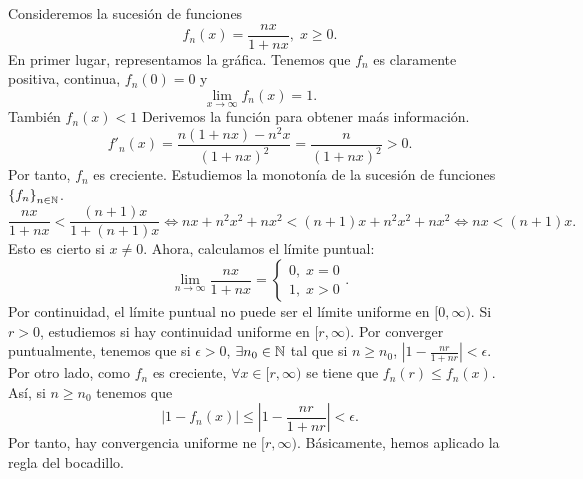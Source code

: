 \begin{eg}
\normalfont Consideremos la sucesión de funciones
\[f_{n}\left(x\right) = \frac{nx}{1+nx}, \; x \geq 0 .\]
En primer lugar, representamos la gráfica. Tenemos que $\displaystyle f_{n} $ es claramente positiva, continua, $\displaystyle f_{n}\left(0\right) = 0 $ y 
\[\lim_{x \to \infty}f_{n}\left(x\right) = 1 .\]
También $\displaystyle f_{n}\left(x\right) < 1 $ Derivemos la función para obtener maás información. 
\[f'_{n}\left(x\right) = \frac{n\left(1+nx\right)-n^{2}x}{\left(1+nx\right)^{2}} = \frac{n}{\left(1+nx\right)^{2}} > 0 .\]
Por tanto, $\displaystyle f_{n} $ es creciente. Estudiemos la monotonía de la sucesión de funciones $\displaystyle \left\{ f_{n}\right\} _{n\in\mathbb{N}} $. 
\[ \frac{nx}{1 + nx } < \frac{\left(n+1\right)x}{1 + \left(n+1\right)x} \iff nx + n^{2}x^{2}+nx^{2}<\left(n+1\right)x + n^{2}x^{2} + nx^{2} \iff nx < \left(n+1\right)x .\]
Esto es cierto si $\displaystyle x \neq 0 $. Ahora, calculamos el límite puntual:
\[\lim_{n \to \infty}\frac{nx}{1 + nx } = 
\begin{cases}
0, \; x = 0 \\
1, \; x > 0
\end{cases}
.\]
Por continuidad, el límite puntual no puede ser el límite uniforme en $\displaystyle [0,\infty) $. Si $\displaystyle r > 0 $, estudiemos si hay continuidad uniforme en $\displaystyle [r,\infty) $. Por converger puntualmente, tenemos que si $\displaystyle \epsilon > 0 $, $\displaystyle \exists n_{0} \in \mathbb{N} $ tal que si $\displaystyle n \geq n_{0} $, $\displaystyle \left|1 -\frac{nr}{1 + nr}\right|<\epsilon  $. Por otro lado, como $\displaystyle f_{n} $ es creciente, $\displaystyle \forall x \in [r,\infty) $ se tiene que $\displaystyle f_{n}\left(r\right) \leq f_{n}\left(x\right) $. 
Así, si $\displaystyle n \geq n_{0} $ tenemos que 
\[ \left|1-f_{n}\left(x\right)\right| \leq \left|1 - \frac{nr}{1 + nr}\right| < \epsilon  .\]
Por tanto, hay convergencia uniforme ne $\displaystyle [r, \infty) $. Básicamente, hemos aplicado la regla del bocadillo.
\end{eg}
